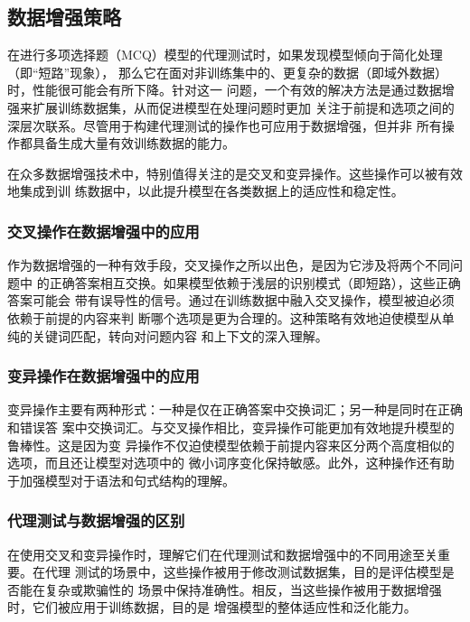 \subsection{数据增强策略}

在进行多项选择题（MCQ）模型的代理测试时，如果发现模型倾向于简化处理（即``短路''现象），
那么它在面对非训练集中的、更复杂的数据（即域外数据）时，性能很可能会有所下降。针对这一
问题，一个有效的解决方法是通过数据增强来扩展训练数据集，从而促进模型在处理问题时更加
关注于前提和选项之间的深层次联系。尽管用于构建代理测试的操作也可应用于数据增强，但并非
所有操作都具备生成大量有效训练数据的能力。

在众多数据增强技术中，特别值得关注的是交叉和变异操作。这些操作可以被有效地集成到训
练数据中，以此提升模型在各类数据上的适应性和稳定性。

\subsubsection{交叉操作在数据增强中的应用}

作为数据增强的一种有效手段，交叉操作之所以出色，是因为它涉及将两个不同问题中
的正确答案相互交换。如果模型依赖于浅层的识别模式（即短路），这些正确答案可能会
带有误导性的信号。通过在训练数据中融入交叉操作，模型被迫必须依赖于前提的内容来判
断哪个选项是更为合理的。这种策略有效地迫使模型从单纯的关键词匹配，转向对问题内容
和上下文的深入理解。

\subsubsection{变异操作在数据增强中的应用}

变异操作主要有两种形式：一种是仅在正确答案中交换词汇；另一种是同时在正确和错误答
案中交换词汇。与交叉操作相比，变异操作可能更加有效地提升模型的鲁棒性。这是因为变
异操作不仅迫使模型依赖于前提内容来区分两个高度相似的选项，而且还让模型对选项中的
微小词序变化保持敏感。此外，这种操作还有助于加强模型对于语法和句式结构的理解。

\subsubsection{代理测试与数据增强的区别}

在使用交叉和变异操作时，理解它们在代理测试和数据增强中的不同用途至关重要。在代理
测试的场景中，这些操作被用于修改测试数据集，目的是评估模型是否能在复杂或欺骗性的
场景中保持准确性。相反，当这些操作被用于数据增强时，它们被应用于训练数据，目的是
增强模型的整体适应性和泛化能力。

